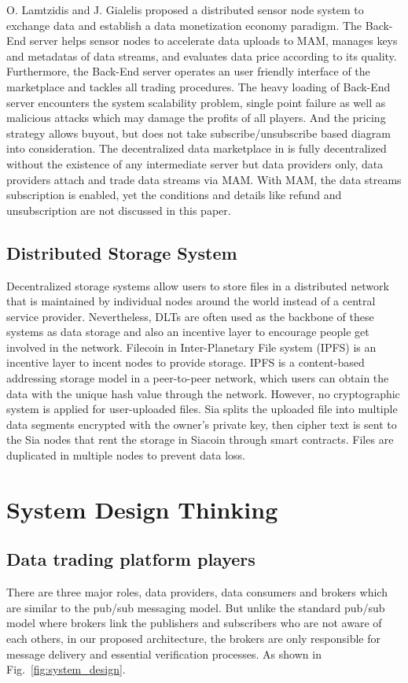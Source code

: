 \documentclass[conference]{IEEEtran}
\begin{document}
O. Lamtzidis and J. Gialelis \cite{IOTASensorNode} proposed a distributed sensor node system to exchange data and establish a data monetization economy paradigm. The Back-End server helps sensor nodes to accelerate data uploads to MAM, manages keys and metadatas of data streams, and evaluates data price according to its quality. Furthermore, the Back-End server operates an user friendly interface of the marketplace and tackles all trading procedures. The heavy loading of Back-End server encounters the system scalability problem, single point failure as well as malicious attacks which may damage the profits of all players. And the pricing strategy allows buyout, but does not take subscribe/unsubscribe based diagram into consideration. The decentralized data marketplace in \cite{DDMSmartCities} is fully decentralized without the existence of any intermediate server but data providers only, data providers attach and trade data streams via MAM. With MAM, the data streams subscription is enabled, yet the conditions and details like refund and unsubscription are not discussed in this paper. 
 
\subsection{Distributed Storage System}
Decentralized storage systems allow users to store files in a distributed network that is maintained by individual nodes around the world instead of a central service provider. Nevertheless, DLTs are often used as the backbone of these systems as data storage and also an incentive layer to encourage people get involved in the network. Filecoin \cite{FileCoin} in Inter-Planetary File system (IPFS) is an incentive layer to incent nodes to provide storage. IPFS is a content-based addressing storage model in a peer-to-peer network, which users can obtain the data with the unique hash value through the network. However, no cryptographic system is applied for user-uploaded files. Sia\cite{Sia} splits the uploaded file into multiple data segments encrypted with the owner's private key, then cipher text is sent to the Sia nodes that rent the storage in Siacoin through smart contracts. Files are duplicated in multiple nodes to prevent data loss.

\section{System Design Thinking}
\subsection{Data trading platform players}
There are three major roles, data providers, data consumers and brokers which are similar to the pub/sub messaging model. But unlike the standard pub/sub model where brokers link the publishers and subscribers who are not aware of each others, in our proposed architecture, the brokers are only responsible for message delivery and essential verification processes. As shown in Fig.~\ref{fig:system_design}.
\end{document}
